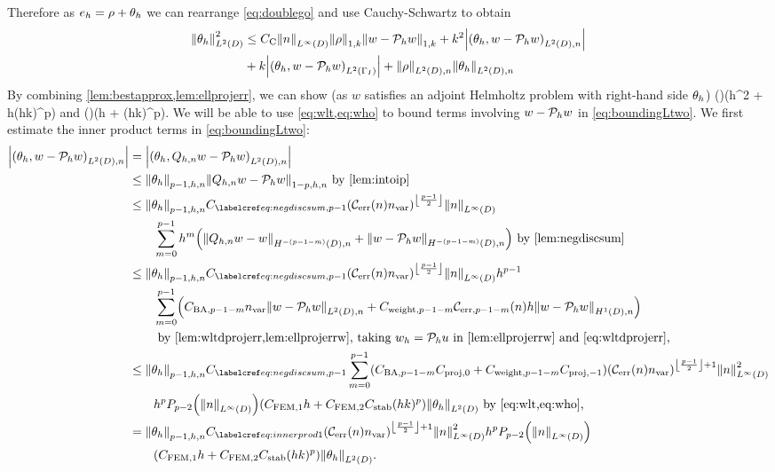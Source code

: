 Therefore as $e_{h} = \rho + \theta_{h}$ we can rearrange \cref{eq:doublego} and use Cauchy-Schwartz to obtain
\begin{align}
\NLtD{\thetah}^2 &\leq \Cc\NLiD{n} \NW{\rho} \NW{w- \Ph w} + k^2 \abs{\IPLtDn{\thetah}{w- \Ph w}}\nonumber\\
&+ k \abs{\IPLtGI{\thetah}{w-\Ph w}} + \NLtDn{\rho}\NLtDn{\thetah}\label{eq:boundingLtwo}
\end{align}
By combining \cref{lem:bestapprox,lem:ellprojerr}, we can show (as $w$ satisfies an adjoint Helmholtz problem with right-hand side $\theta_{h}$)
\beq\label{eq:wlt}
 \leq {} \mleft(\mright)\mleft(\CFEMotilde h^2 + \CFEMttilde \CAnk h(hk)^p\mright)\NLtD{\thetah}
\eeq
and
\beq\label{eq:who}
  \mleft(\mright)\mleft(\CFEMotilde h + \CFEMttilde \CAnk (hk)^p\mright)\NLtD{\thetah}.
\eeq
We will be able to use \cref{eq:wlt,eq:who} to bound terms involving $w - \mathcal P_{h} w$ in \cref{eq:boundingLtwo}. We first estimate the inner product terms in \cref{eq:boundingLtwo}:
\begin{align}
\abs{\IPLtDn{\thetah}{w- \Ph w}} &= \abs{\IPLtDn{\thetah}{\Qhn w - \Ph w}}\nonumber\\
&\leq \Nfn{p-1,h,n}{\thetah}\Nfn{1-p,h,n}{\Qhn w - \Ph w}\text{ by \cref{lem:intoip}}\nonumber\\
&\leq \Nfn{p-1,h,n}{\thetah} \Csumfn{p-1} \mleft(\En \nvar\mright)^{\floor{\frac{p-1}2}}\NLiD{n}\nonumber\\
&\quad\quad\sum_{m=0}^{p-1} h^{m}\mleft(\NHnfn{-(p-1-m)}{D}{\Qhn w - w}+ \NHnfn{-(p-1-m)}{D}{w - \Ph w}\mright) \text{ by \cref{lem:negdiscsum}}\nonumber\\
&\leq \Nfn{p-1,h,n}{\thetah} \Csumfn{p-1}\mleft(\En \nvar\mright)^{\floor{\frac{p-1}2}}\NLiD{n} h^{p-1}\nonumber\\
&\quad\quad\sum_{m=0}^{p-1} \mleft(\CSZfn{p-1-m}\nvar \NLtDn{w - \Ph w} + \Cwfn{p-1-m} \errn{p-1-m} h \NHoDn{w - \Ph w}\mright)\nonumber\\
&\quad\quad\text{ by \cref{lem:wltdprojerr,lem:ellprojerrw}, taking $\wh = \Ph u$ in \cref{lem:ellprojerrw} and \cref{eq:wltdprojerr},}\nonumber\\
&\leq \Nfn{p-1,h,n}{\thetah} \Csumfn{p-1}\sum_{m=0}^{p-1} \mleft(\CSZfn{p-1-m}\Cprojfn{0} + \Cwfn{p-1-m} \Cprojfn{-1}\mright)                         \mleft(\En \nvar\mright)^{\floor{\frac{p-1}2}+1}\NLiD{n}^2 \nonumber\\
&\quad\quad h^p \Pfn{p-2}\mleft(\NLiD{n}\mright)\mleft(\CFEMotilde h + \CFEMttilde \CAnk (hk)^p\mright) \NLtD{\thetah} \text{ by \cref{eq:wlt,eq:who},}\nonumber\\
&=\Nfn{p-1,h,n}{\thetah}  \Cfourteen \mleft(\En \nvar\mright)^{\floor{\frac{p-1}2}+1}\NLiD{n}^2 h^p \Pfn{p-2}\mleft(\NLiD{n}\mright)\nonumber\\
&\quad\quad\mleft(\CFEMotilde h + \CFEMttilde \CAnk (hk)^p\mright) \NLtD{\thetah} \label{eq:innerprod1}.
\end{align}

